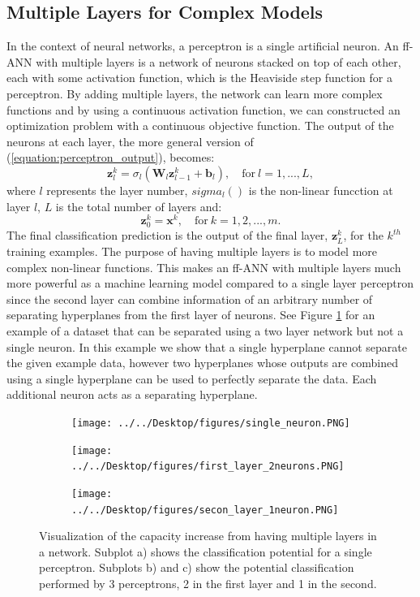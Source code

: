 \documentclass[letterpaper,12pt,titlepage,oneside,final]{book}
\begin{document}
	\subsection{Multiple Layers for Complex Models}
	
	In the context of neural networks, a perceptron is a single artificial neuron. An ff-ANN with multiple layers is a network of neurons stacked on top of each other, each with some activation function, which is the Heaviside step function for a perceptron. By adding multiple layers, the network can learn more complex functions and by using a continuous activation function, we can constructed an optimization problem with a continuous objective function. The output of the neurons at each layer, the more general version of (\ref{equation:perceptron_output}), becomes:
	\begin{equation}
	\mathbf{z}_{l}^{k} = \sigma_{l}(\mathbf{W}_{l}\mathbf{z}_{l-1}^{k} + \mathbf{b}_{l}), \quad \text{for} \ l = 1, ... , L,
	\end{equation}
	where $l$ represents the layer number, $sigma_{l}()$ is the non-linear funcction at layer $l$, $L$ is the total number of layers and:
	\begin{equation}
	\mathbf{z}_{0}^{k} = \mathbf{x}^{k}, \quad \text{for} \ k=1, 2, ... , m.
	\end{equation}
	The final classification prediction is the output of the final layer, $\mathbf{z}_{L}^{k}$, for the $k^{th}$ training examples. The purpose of having multiple layers is to model more complex non-linear functions. This makes an ff-ANN with multiple layers much more powerful as a machine learning model compared to a single layer perceptron since the second layer can combine information of an arbitrary number of separating hyperplanes from the first layer of neurons. See Figure \ref{figure:MLP} for an example of a dataset that can be separated using a two layer network but not a single neuron. In this example we show that a single hyperplane cannot separate the given example data, however two hyperplanes whose outputs are combined using a single hyperplane can be used to perfectly separate the data. Each additional neuron acts as a separating hyperplane.
	\begin{figure}
		\centering
		\begin{subfigure}{.3\textwidth}
			\texttt{[image: ../../Desktop/figures/single\_neuron.PNG]}
			\caption{}
		\end{subfigure}
		\begin{subfigure}{.3\textwidth}
			\texttt{[image: ../../Desktop/figures/first\_layer\_2neurons.PNG]}
			\caption{}
		\end{subfigure}
		\begin{subfigure}{.3\textwidth}
			\texttt{[image: ../../Desktop/figures/secon\_layer\_1neuron.PNG]}
			\caption{}
		\end{subfigure}
		\caption{Visualization of the capacity increase from having multiple layers in a network. Subplot a) shows the classification potential for a single perceptron. Subplots b) and c) show the potential classification performed by 3 perceptrons, 2 in the first layer and 1 in the second.}
		\label{figure:MLP}
	\end{figure}
	
\end{document}
